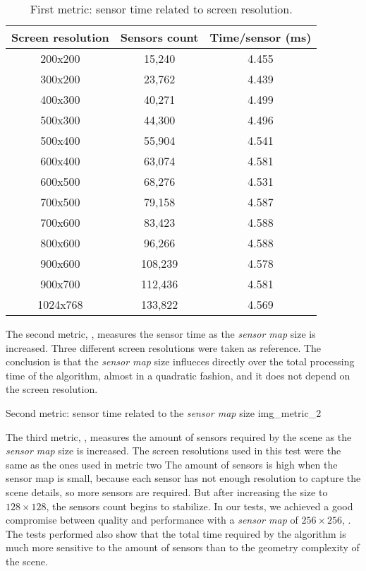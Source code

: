 \documentclass[10pt, conference]{IEEEtran}
\begin{document}
\begin{table}
	\caption{First metric: sensor time related to screen resolution.}
	\label{tab:metric_1}
	\centering
	\begin{tabular}{c|c|c}
		\multicolumn{1}{c}{\bf Screen resolution} &
		\multicolumn{1}{c|}{\bf Sensors count} &
		\multicolumn{1}{c}{\bf  Time/sensor (ms)} \\
		\hline
		200x200 & 15,240 & 4.455 \\
		300x200 & 23,762 & 4.439\\
		400x300 & 40,271 & 4.499 \\
		500x300 & 44,300 & 4.496 \\
		500x400 & 55,904 & 4.541 \\
		600x400 & 63,074 & 4.581 \\
		600x500 & 68,276 & 4.531 \\
		700x500 & 79,158 & 4.587 \\
		700x600 & 83,423 & 4.588 \\
		800x600 & 96,266 & 4.588 \\
		900x600 & 108,239 & 4.578 \\
		900x700 & 112,436 & 4.581 \\
		1024x768 & 133,822 & 4.569\\
	\end{tabular}
\end{table}

The second metric, , measures the sensor time as the \emph{sensor map} size is increased. 
Three different screen resolutions were taken as reference.
The conclusion is that the \emph{sensor map} size influeces directly over the total processing time of the algorithm, almost in a quadratic fashion, 
and it does not depend on the screen resolution.

\subimages
	{Second metric: sensor time related to the \emph{sensor map} size}
	{img_metric_2}{
}

The third metric, , measures the amount of sensors required by the scene as the \emph{sensor map} size is increased.
The screen resolutions used in this test were the same as the ones used in metric two
The amount of sensors is high when the sensor map is small, because each sensor has not enough resolution to capture the scene details, so more sensors are required.
But after increasing the size to $128 \times 128$, the sensors count begins to stabilize.
In our tests, we achieved a good compromise between quality and performance with a \emph{sensor map} of $256 \times 256$, .
The tests performed also show that the total time required by the algorithm is much more sensitive to the amount of sensors than to the geometry complexity of the scene.\
\end{document}
